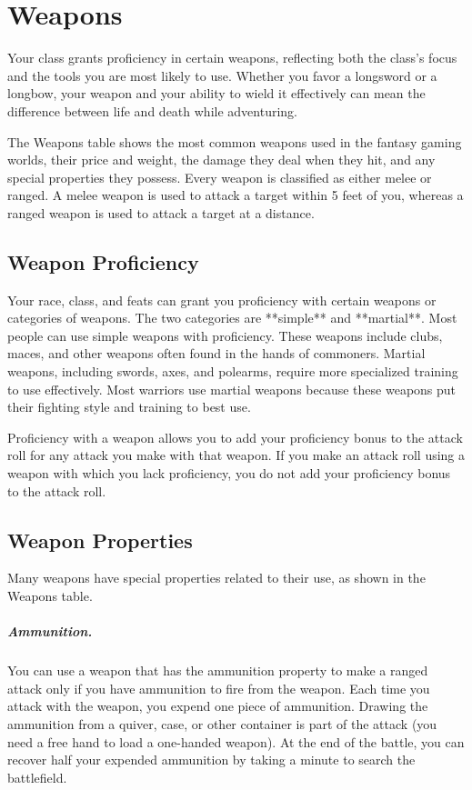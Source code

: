 \section{Weapons}

Your class grants proficiency in certain weapons, reflecting both the class's focus and the tools you are most likely to use. Whether you favor a longsword or a longbow, your weapon and your ability to wield it effectively can mean the difference between life and death while adventuring.

The Weapons table shows the most common weapons used in the fantasy gaming worlds, their price and weight, the damage they deal when they hit, and any special properties they possess. Every weapon is classified as either melee or ranged. A melee weapon is used to attack a target within 5 feet of you, whereas a ranged weapon is used to attack a target at a distance.

\subsection{Weapon Proficiency}

Your race, class, and feats can grant you proficiency with certain weapons or categories of weapons. The two categories are **simple** and **martial**. Most people can use simple weapons with proficiency. These weapons include clubs, maces, and other weapons often found in the hands of commoners. Martial weapons, including swords, axes, and polearms, require more specialized training to use effectively. Most warriors use martial weapons because these weapons put their fighting style and training to best use.

Proficiency with a weapon allows you to add your proficiency bonus to the attack roll for any attack you make with that weapon. If you make an attack roll using a weapon with which you lack proficiency, you do not add your proficiency bonus to the attack roll.

\subsection{Weapon Properties}

Many weapons have special properties related to their use, as shown in the Weapons table.

\subparagraph*{Ammunition.} You can use a weapon that has the ammunition property to make a ranged attack only if you have ammunition to fire from the weapon. Each time you attack with the weapon, you expend one piece of ammunition. Drawing the ammunition from a quiver, case, or other container is part of the attack (you need a free hand to load a one-handed weapon). At the end of the battle, you can recover half your expended ammunition by taking a minute to search the battlefield.

